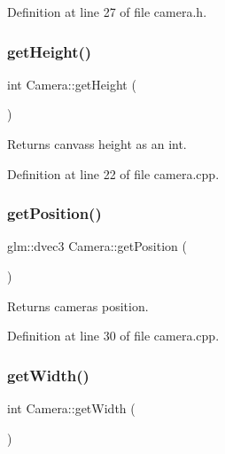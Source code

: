 Definition at line 27 of file camera.\+h.

\mbox{\label{class_camera_a315be9ee1238abddce9a580430ad403a}} 
\subsubsection{\texorpdfstring{get\+Height()}{getHeight()}}
{\footnotesize\ttfamily int Camera\+::get\+Height (\begin{DoxyParamCaption}{ }\end{DoxyParamCaption})}



Returns canvas\textquotesingle{}s height as an int. 



Definition at line 22 of file camera.\+cpp.

\mbox{\label{class_camera_a4ea62b0ec351ac3cf4bd228617a3ec54}} 
\subsubsection{\texorpdfstring{get\+Position()}{getPosition()}}
{\footnotesize\ttfamily glm\+::dvec3 Camera\+::get\+Position (\begin{DoxyParamCaption}{ }\end{DoxyParamCaption})}



Returns camera\textquotesingle{}s position. 



Definition at line 30 of file camera.\+cpp.

\mbox{\label{class_camera_a1122b43b7db5e69e9d6e187b74a6ec7e}} 
\subsubsection{\texorpdfstring{get\+Width()}{getWidth()}}
{\footnotesize\ttfamily int Camera\+::get\+Width (\begin{DoxyParamCaption}{ }\end{DoxyParamCaption})}



